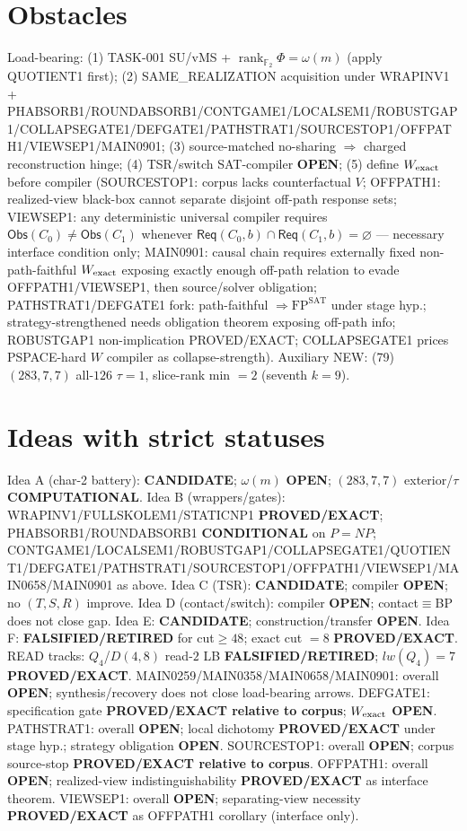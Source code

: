 \documentclass[11pt]{article}
\begin{document}
\section*{Obstacles}
Load-bearing: (1) TASK-001 SU/vMS + $\operatorname{rank}_{\mathbb F_2}\Phi=\omega(m)$ (apply QUOTIENT1 first);
(2) SAME\_REALIZATION acquisition under WRAPINV1 + PHABSORB1/ROUNDABSORB1/CONTGAME1/LOCALSEM1/ROBUSTGAP1/COLLAPSEGATE1/DEFGATE1/PATHSTRAT1/SOURCESTOP1/OFFPATH1/VIEWSEP1/MAIN0901;
(3) source-matched no-sharing $\Rightarrow$ charged reconstruction hinge;
(4) TSR/switch SAT-compiler \textbf{OPEN};
(5) define $W_{\rm exact}$ before compiler (SOURCESTOP1: corpus lacks counterfactual $V$;
OFFPATH1: realized-view black-box cannot separate disjoint off-path response sets;
VIEWSEP1: any deterministic universal compiler requires $\mathsf{Obs}(C_0)\ne\mathsf{Obs}(C_1)$
whenever $\mathsf{Req}(C_0,b)\cap\mathsf{Req}(C_1,b)=\varnothing$ --- necessary interface condition only;
MAIN0901: causal chain requires externally fixed non-path-faithful $W_{\rm exact}$ exposing
exactly enough off-path relation to evade OFFPATH1/VIEWSEP1, then source/solver obligation;
PATHSTRAT1/DEFGATE1 fork: path-faithful $\Rightarrow\mathrm{FP}^{\mathrm{SAT}}$ under stage hyp.;
strategy-strengthened needs obligation theorem exposing off-path info;
ROBUSTGAP1 non-implication PROVED/EXACT; COLLAPSEGATE1 prices PSPACE-hard $W$ compiler as collapse-strength).
Auxiliary NEW: (79) $(283,7,7)$ all-$126$ $\tau{=}1$, slice-rank min $=2$ (seventh $k{=}9$).

\section*{Ideas with strict statuses}
Idea A (char-2 battery): \textbf{CANDIDATE}; $\omega(m)$ \textbf{OPEN}; $(283,7,7)$ exterior/$\tau$ \textbf{COMPUTATIONAL}.
Idea B (wrappers/gates): WRAPINV1/FULLSKOLEM1/STATICNP1 \textbf{PROVED/EXACT};
PHABSORB1/ROUNDABSORB1 \textbf{CONDITIONAL} on $P=NP$;
CONTGAME1/LOCALSEM1/ROBUSTGAP1/COLLAPSEGATE1/QUOTIENT1/DEFGATE1/PATHSTRAT1/SOURCESTOP1/OFFPATH1/VIEWSEP1/MAIN0658/MAIN0901 as above.
Idea C (TSR): \textbf{CANDIDATE}; compiler \textbf{OPEN}; no $(T,S,R)$ improve.
Idea D (contact/switch): compiler \textbf{OPEN}; contact$\equiv$BP does not close gap.
Idea E: \textbf{CANDIDATE}; construction/transfer \textbf{OPEN}.
Idea F: \textbf{FALSIFIED/RETIRED} for cut$\ge48$; exact cut $=8$ \textbf{PROVED/EXACT}.
READ tracks: $Q_4$/$D(4,8)$ read-$2$ LB \textbf{FALSIFIED/RETIRED}; $lw(Q_4)=7$ \textbf{PROVED/EXACT}.
MAIN0259/MAIN0358/MAIN0658/MAIN0901: overall \textbf{OPEN}; synthesis/recovery does not close load-bearing arrows.
DEFGATE1: specification gate \textbf{PROVED/EXACT relative to corpus}; $W_{\rm exact}$ \textbf{OPEN}.
PATHSTRAT1: overall \textbf{OPEN}; local dichotomy \textbf{PROVED/EXACT} under stage hyp.; strategy obligation \textbf{OPEN}.
SOURCESTOP1: overall \textbf{OPEN}; corpus source-stop \textbf{PROVED/EXACT relative to corpus}.
OFFPATH1: overall \textbf{OPEN}; realized-view indistinguishability \textbf{PROVED/EXACT} as interface theorem.
VIEWSEP1: overall \textbf{OPEN}; separating-view necessity \textbf{PROVED/EXACT} as OFFPATH1 corollary (interface only).
\end{document}
